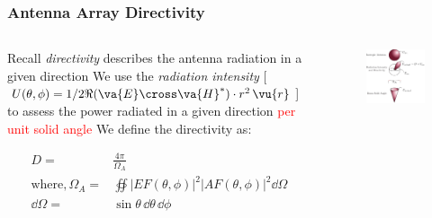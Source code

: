 \documentclass[10pt]{beamer}
\begin{document}
\begin{frame}
    \frametitle{Antenna Array Directivity}

    \begin{columns}
        \begin{column}{.7\textwidth}
            \begin{outline}
                \1 Recall \textit{directivity} describes the antenna radiation in a given direction
                \2 We use the \textit{radiation intensity} [$U(\theta, \phi) = 1/2 \Re (\va{E} \cross \va{H}^{*}) \cdot r^2 \, \vu{r}$] to assess the power radiated in a given direction \textcolor{red}{per unit solid angle}
                \1 We define the directivity as:
            \end{outline}
            \begin{align*}
                D {}=& \frac{4 \pi }{\Omega_A} \\
                \text{where}, \Omega_A {}=& \oiint |EF(\theta,\phi)|^2 |{AF}(\theta,\phi)|^2 \dd \Omega \\
                \dd \Omega {}=& \sin \theta \, \dd \theta \, \dd \phi
            \end{align*}
        \end{column}
        \begin{column}{.3\textwidth}
            \begin{figure}[h!]
                \centering
                \includegraphics[width=1.20\textwidth]{antenna_dir.pdf}
            \end{figure}
        \end{column}
    \end{columns}
\end{frame}
\end{document}
